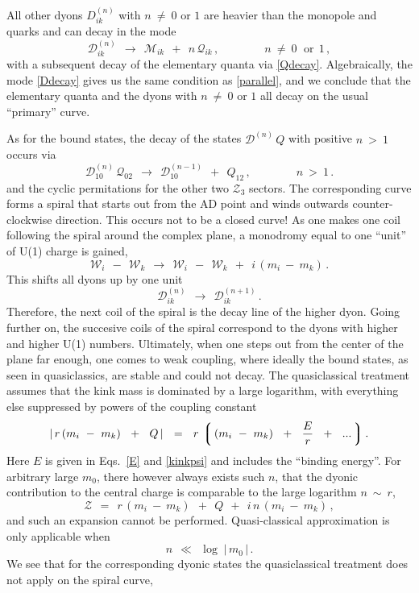 \documentclass[epsfig,12pt]{article}
\def\beq{\begin{equation}}
\def\eeq{\end{equation}}
\def\beq{\begin{equation}}
\def\eeq{\end{equation}}
\newcommand{\mc}[1]{\mathcal{#1}}
\newcommand{\lgr}{\left\lgroup}
\newcommand{\rgr}{\right\rgroup}
\newcommand{\W}{\mathcal{W}}
\newcommand{\M}{\mathcal{M}}
\newcommand{\Q}{\mathcal{Q}}
\newcommand{\D}{\mathcal{D}}
\begin{document}
	All other dyons $ D_{ik}^{(n)} $ with $ n ~\neq~ 0 $ or $ 1 $ are heavier than the monopole and quarks and can decay in the mode
\beq
\label{Ddecay}
	\D_{ik}^{(n)}  ~~\longrightarrow~~ \M_{ik} ~~+~~ n\, \Q_{ik} \,, \qquad\qquad n ~\neq~ 0\, ~~\text{or}~~ 1\,,
\eeq
	with a subsequent decay of the elementary quanta via \eqref{Qdecay}.
	Algebraically, the mode \eqref{Ddecay} gives us the same condition as \eqref{parallel}, and 
	we conclude that the elementary quanta and the dyons with $ n ~\neq~ 0 $ or $ 1 $ all decay 
	on the usual ``primary'' curve.

	As for the bound states, the decay of the states $ \D^{(n)}\, Q $ with positive $ n ~>~ 1 $ occurs via
\beq
\label{spirpos}
	\D^{(n)}_{10}\, \Q_{02}  ~~\longrightarrow~~  \D^{(n-1)}_{10}  ~~+~~  Q_{12}\,,
	\qquad\qquad
	n ~>~ 1\,.
\eeq
	and the cyclic permitations for the other two $ \mc{Z}_3 $ sectors.
	The corresponding curve forms a spiral that starts out from the AD point and winds outwards counter-clockwise direction.
	This occurs not to be a closed curve!
	As one makes one coil following the spiral around the complex plane, a monodromy equal to one ``unit'' of U(1)
	charge is gained,
\beq
	\W_i  ~~-~~ \W_k  ~~\longrightarrow~~  \W_i  ~~-~~ \W_k  ~~+~~  i\, ( m_i ~-~ m_k )\,.
\eeq
	This shifts all dyons up by one unit 
\beq
	\D^{(n)}_{ik}  ~~\longrightarrow~~  \D^{(n+1)}_{ik}\,.
\eeq
	Therefore, the next coil of the spiral is the decay line of the higher dyon. 
	Going further on, the succesive coils of the spiral correspond to the dyons with higher and higher U(1) numbers.
	Ultimately, when one steps out from the center of the plane far enough, one comes to weak coupling,
	where ideally the bound states, as seen in quasiclassics, are stable and could not decay.
	The quasiclassical treatment assumes that the kink mass is dominated by a large logarithm,
	with everything else suppressed by powers of the coupling constant
\beq
	|\, r\, ( m_i ~-~ m_k ) ~~+~~ Q \, |  ~~=~~  r \, \lgr\, ( m_i ~-~ m_k ) ~~+~~ \frac{ E }{r} ~~+~~ ... \,\rgr .
\eeq
	Here $ E $ is given in Eqs.~\eqref{E} and \eqref{kinkpsi} and includes the ``binding energy''.
	For arbitrary large $ m_0 $, there however always exists such $ n $, that the dyonic contribution to the central charge
	is comparable to the large logarithm $ n ~\sim~ r $, 
\beq
	\mc{Z} ~~=~~ r \, ( m_i ~-~ m_k ) ~~+~~ Q ~~+~~ i\, n\, ( m_i ~-~ m_k )\,,
\eeq
	and such an expansion cannot be performed.
	Quasi-classical approximation is only applicable when
\beq
	n  ~~\ll~~  \log\; |\, m_0 \,| \,.
\eeq
	We see that for the corresponding dyonic states the quasiclassical treatment does not apply on the spiral curve, 
\end{document}
